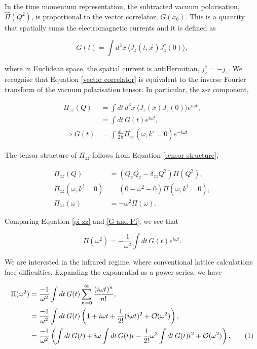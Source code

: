 \documentclass{article}
\numberwithin{equation}{section} %
\begin{document}
In the time momentum representation, the subtracted vacuum polarisation, $\hat{\Pi}(Q^2)$, is proportional to the vector correlator, $G(x_0)$. This is a quantity that spatially sums the electromagnetic currents and it is defined as

\begin{equation}
G(t) = \int d^3x \, \langle J_z(t,\vec{x})J_z^\dag(0)\rangle,
\label{vector correlator}
\end{equation}

\noindent where in Euclidean space, the spatial current is antiHermitian, $j^\dag_z=-j_z$\cite{vector}. We recognise that Equation \ref{vector correlator} is equivalent to the inverse Fourier transform of the vacuum polarisation tensor. In particular, the z-z component,

\begin{equation}
\begin{split}
\Pi_{zz}(Q) &= \int dt\,d^3x \, \langle J_z(x) J_z(0)\rangle e^{i\omega t},\\
&= \int dt \, G(t) e^{i\omega t},\\
\Rightarrow G(t) &= \int \frac{d\omega}{2\pi} \Pi_{zz}(\omega,k^i=0)e^{-i\omega t}
\end{split}
\label{G and Pi}
\end{equation}

\noindent The tensor structure of $\Pi_{zz}$ follows from Equation \ref{tensor structure},

\begin{equation}
\begin{split}
\Pi_{zz}(Q) &=\left(Q_z Q_z - \delta_{zz}Q^2 \right)\Pi(Q^2),\\
\Pi_{zz}(\omega,k^i=0) &=\left(0 - \omega^2 - 0 \right)\Pi(\omega,k^i=0),\\
\Pi_{zz}(\omega) &= -\omega^2\Pi(\omega).
\end{split}
\label{pi zz}
\end{equation}

\noindent Comparing Equation \ref{pi zz} and \ref{G and Pi}, we see that 

\begin{equation}
\Pi(\omega^2)= -\frac{1}{\omega^2}\int dt \, G(t) e^{i\omega t}.
\label{hvp - correlator}
\end{equation}

We are interested in the infrared regime, where conventional lattice calculations face difficulties. Expanding the exponential as a power series, we have

\begin{align*}
\Pi(\omega^2)&= \frac{-1}{\omega^2}\int dt \, G(t) \sum_{n=0}^\infty \frac{(i\omega t)^n}{n!},\\
&= \frac{-1}{\omega^2}\int dt \, G(t) \left(1 +i\omega t+\frac{1}{2!}(i\omega t)^2 + \mathcal{O}(\omega^2) \right),\\
&= \frac{-1}{\omega^2} \left(\int dt \, G(t) + i\omega \int dt \, G(t)t-\frac{1}{2!}\omega^2 \int dt \, G(t)t^2 + \mathcal{O}(\omega^2) \right).
\tag{\refstepcounter{equation}\theequation}
\end{align*}
\end{document}

